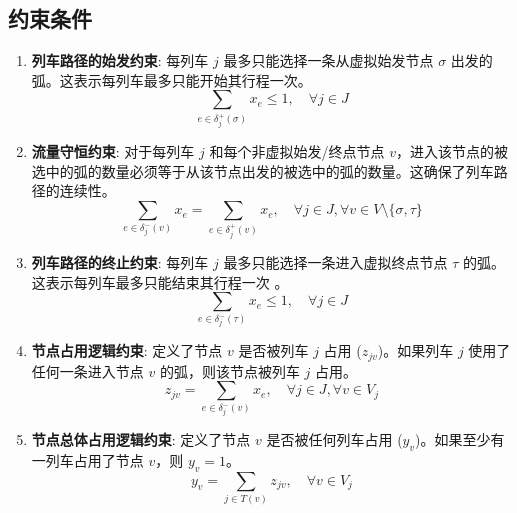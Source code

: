\documentclass{article}
\begin{document}
    \subsection*{约束条件}
    \begin{enumerate}
        \item \textbf{列车路径的始发约束}:
        每列车 $j$ 最多只能选择一条从虚拟始发节点 $\sigma$ 出发的弧。这表示每列车最多只能开始其行程一次。
        \begin{equation}
            \sum_{e \in \delta_j^+(\sigma)} x_e \le 1, \quad \forall j \in J\label{eq:con_start}
        \end{equation}

        \item \textbf{流量守恒约束}:
        对于每列车 $j$ 和每个非虚拟始发/终点节点 $v$，进入该节点的被选中的弧的数量必须等于从该节点出发的被选中的弧的数量。这确保了列车路径的连续性。
        \begin{equation}
            \sum_{e \in \delta_j^-(v)} x_e = \sum_{e \in \delta_j^+(v)} x_e, \quad \forall j \in J, \forall v \in V \setminus \{\sigma, \tau\}\label{eq:con_flow}
        \end{equation}

        \item \textbf{列车路径的终止约束}:
        每列车 $j$ 最多只能选择一条进入虚拟终点节点 $\tau$ 的弧。这表示每列车最多只能结束其行程一次 。
        \begin{equation}
            \sum_{e \in \delta_j^-(\tau)} x_e \le 1, \quad \forall j \in J\label{eq:con_end}
        \end{equation}

        \item \textbf{节点占用逻辑约束}:
        定义了节点 $v$ 是否被列车 $j$ 占用 ($z_{jv}$)。如果列车 $j$ 使用了任何一条进入节点 $v$ 的弧，则该节点被列车 $j$ 占用。
        \begin{equation}
            z_{jv} = \sum_{e \in \delta_j^-(v)} x_e, \quad \forall j \in J, \forall v \in V_j\label{eq:con_node_occupied}
        \end{equation}

        \item \textbf{节点总体占用逻辑约束}:
        定义了节点 $v$ 是否被任何列车占用 ($y_v$)。如果至少有一列车占用了节点 $v$，则 $y_v=1$。
        \begin{equation}
            y_v = \sum_{j \in T(v)} z_{jv}, \quad \forall v \in V_j\label{eq:con_node_occupied_total}
        \end{equation}


\end{enumerate}
\end{document}
